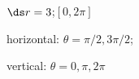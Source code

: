 {$\ds r=3$;\quad $[0,2\pi]$}
{horizontal: $\theta=\pi/2,3\pi/2$;

vertical: $\theta = 0,\pi,2\pi$
}
